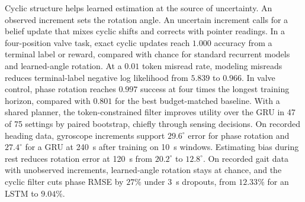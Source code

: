 Cyclic structure helps learned estimation at the source of uncertainty.
An observed increment sets the rotation angle. An uncertain increment calls
for a belief update that mixes cyclic shifts and corrects with pointer readings.
In a four-position valve task, exact cyclic updates reach $1.000$ accuracy
from a terminal label or reward, compared with chance for standard recurrent
models and learned-angle rotation. At a $0.01$ token misread rate, modeling
misreads reduces terminal-label negative log likelihood from $5.839$ to $0.966$.
In valve control, phase rotation reaches $0.997$ success at four times the
longest training horizon, compared with $0.801$ for the best budget-matched
baseline. With a shared planner, the token-constrained filter improves utility
over the GRU in 47 of 75 settings by paired bootstrap, chiefly through sensing
decisions. On recorded heading data, gyroscope increments support $29.6^\circ$
error for phase rotation and $27.4^\circ$ for a GRU at 240~s after training on
10~s windows. Estimating bias during rest reduces rotation error at 120~s from
$20.2^\circ$ to $12.8^\circ$. On recorded gait data with unobserved increments,
learned-angle rotation stays at chance, and the cyclic filter cuts phase RMSE
by $27\%$ under 3~s dropouts, from $12.33\%$ for an LSTM to $9.04\%$.
